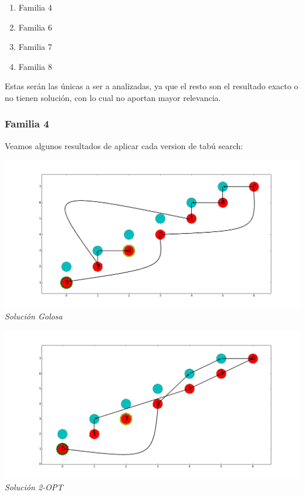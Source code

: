\begin{enumerate}
\item Familia 4
\item Familia 6
\item Familia 7
\item Familia 8
\end{enumerate}

Estas ser\'an las únicas a ser a analizadas, ya que el resto son el resultado exacto o no tienen soluci\'on, con lo cual no aportan mayor relevancia.
 
\subsubsection*{Familia 4}

Veamos algunos resultados de aplicar cada version de tabú search:

\vspace*{0.3cm} \vspace*{0.3cm}
  \begin{center}
 \includegraphics[scale=0.3]{./EJ4/fam4goloso.png}\\
 {            \textit{Soluci\'on Golosa}}
  \end{center}
  \vspace*{0.3cm}

\vspace*{0.3cm} \vspace*{0.3cm}
  \begin{center}
 \includegraphics[scale=0.3]{./EJ4/fam42opt.png}\\
 {            \textit{Soluci\'on 2-OPT}}
  \end{center}
  \vspace*{0.3cm}


